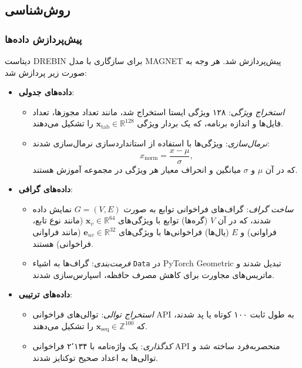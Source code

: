 \subsection{روش‌شناسی}

\subsubsection{پیش‌پردازش داده‌ها}
دیتاست DREBIN برای سازگاری با مدل MAGNET پیش‌پردازش شد. هر وجه به صورت زیر پردازش شد:

\begin{itemize}
    \item \textbf{داده‌های جدولی}:
        \begin{itemize}
            \item \textit{استخراج ویژگی}: ۱۲۸ ویژگی ایستا استخراج شد، مانند تعداد مجوزها، تعداد فایل‌ها و اندازه برنامه، که یک بردار ویژگی \( \mathbf{x}_{\text{tab}} \in \mathbb{R}^{128} \) را تشکیل می‌دهند.
            \item \textit{نرمال‌سازی}: ویژگی‌ها با استفاده از استانداردسازی نرمال‌سازی شدند:
            \[
            x_{\text{norm}} = \frac{x - \mu}{\sigma},
            \]
            که در آن \( \mu \) و \( \sigma \) میانگین و انحراف معیار هر ویژگی در مجموعه آموزش هستند.
        \end{itemize}
    \item \textbf{داده‌های گرافی}:
        \begin{itemize}
            \item \textit{ساخت گراف}: گراف‌های فراخوانی توابع به صورت \( G = (V, E) \) نمایش داده شدند، که در آن \( V \) (گره‌ها) توابع با ویژگی‌های \( \mathbf{x}_v \in \mathbb{R}^{64} \) (مانند نوع تابع، فراوانی) و \( E \) (یال‌ها) فراخوانی‌ها با ویژگی‌های \( \mathbf{e}_{uv} \in \mathbb{R}^{32} \) (مانند فراوانی فراخوانی) هستند.
            \item \textit{فرمت‌بندی}: گراف‌ها به اشیاء \texttt{Data} در PyTorch Geometric تبدیل شدند و ماتریس‌های مجاورت برای کاهش مصرف حافظه، اسپارس‌سازی شدند.
        \end{itemize}
    \item \textbf{داده‌های ترتیبی}:
        \begin{itemize}
            \item \textit{استخراج توالی}: توالی‌های فراخوانی API به طول ثابت ۱۰۰ کوتاه یا پد شدند، که \( \mathbf{x}_{\text{seq}} \in \mathbb{Z}^{100} \) را تشکیل می‌دهند.
            \item \textit{کدگذاری}: یک واژه‌نامه با ۲٬۱۳۴ فراخوانی API منحصربه‌فرد ساخته شد و توالی‌ها به اعداد صحیح توکنایز شدند.
        \end{itemize}
\end{itemize}

